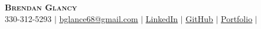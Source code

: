 \documentclass[letterpaper,11pt]{article}
\begin{document}

\begin{center}
    \textbf{\Huge \scshape Brendan Glancy} \\ \vspace{1pt}
    \small 330-312-5293 $|$ \href{mailto:x@x.com}{\underline{bglance68@gmail.com}} $|$ 
    \href{https://linkedin.com/in/brendan-glancy}{\underline{LinkedIn}} $|$
    \href{https://github.com/brendanglancy}{\underline{GitHub}} $|$
    \href{https://dev-port-lac.vercel.app/}{\underline{Portfolio}} $|$
\end{center}


\end{document}
